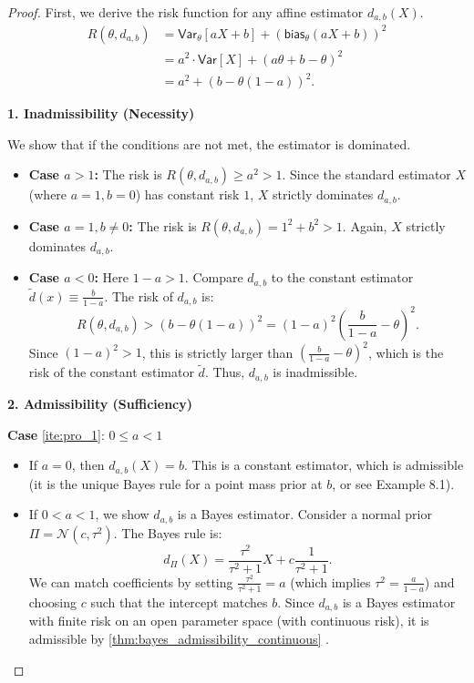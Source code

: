 \begin{proof}
First, we derive the risk function for any affine estimator \(d_{a,b}(X)\).
\[
\begin{split}
R(\theta, d_{a,b}) &= \mathsf{Var}_{\theta}[aX + b] + (\mathsf{bias}_{\theta}(aX + b))^2 \\
&= a^2 \cdot \mathsf{Var}[X] + (a\theta + b - \theta)^2 \\
&= a^2 + (b - \theta(1 - a))^2.
\end{split}
\]

\textbf{1. Inadmissibility (Necessity)}

We show that if the conditions are not met, the estimator is dominated.

\begin{itemize}
    \item \textbf{Case \(a > 1\):}
    The risk is \(R(\theta, d_{a,b}) \ge a^2 > 1\).
    Since the standard estimator \(X\) (where \(a=1, b=0\)) has constant risk \(1\), \(X\) strictly dominates \(d_{a,b}\).
    
    \item \textbf{Case \(a = 1, b \neq 0\):}
    The risk is \(R(\theta, d_{a,b}) = 1^2 + b^2 > 1\).
    Again, \(X\) strictly dominates \(d_{a,b}\).
    
    \item \textbf{Case \(a < 0\):}
    Here \(1-a > 1\). Compare \(d_{a,b}\) to the constant estimator \(\tilde{d}(x) \equiv \frac{b}{1-a}\).
    The risk of \(d_{a,b}\) is:
    \[ R(\theta, d_{a,b}) > (b - \theta(1-a))^2 = (1-a)^2 \left( \frac{b}{1-a} - \theta \right)^2. \]
    Since \((1-a)^2 > 1\), this is strictly larger than \((\frac{b}{1-a} - \theta)^2\), which is the risk of the constant estimator \(\tilde{d}\). Thus, \(d_{a,b}\) is inadmissible.
\end{itemize}

\textbf{2. Admissibility (Sufficiency)}

\textbf{Case} \ref{ite:pro_1}: \(0 \le a < 1\)
\begin{itemize}
    \item If \(a=0\), then \(d_{a,b}(X) = b\). This is a constant estimator, which is admissible (it is the unique Bayes rule for a point mass prior at \(b\), or see Example 8.1).
    \item If \(0 < a < 1\), we show \(d_{a,b}\) is a Bayes estimator. Consider a normal prior \(\Pi = \mathcal{N}(c, \tau^2)\). The Bayes rule is:
    \[ d_{\Pi}(X) = \frac{\tau^2}{\tau^2 + 1} X + c \frac{1}{\tau^2 + 1}. \]
    We can match coefficients by setting \(\frac{\tau^2}{\tau^2+1} = a\) (which implies \(\tau^2 = \frac{a}{1-a}\)) and choosing \(c\) such that the intercept matches \(b\).
    Since \(d_{a,b}\) is a Bayes estimator with finite risk on an open parameter space (with continuous risk), it is admissible by \autoref{thm:bayes_admissibility_continuous} .
\end{itemize}


\end{proof}
